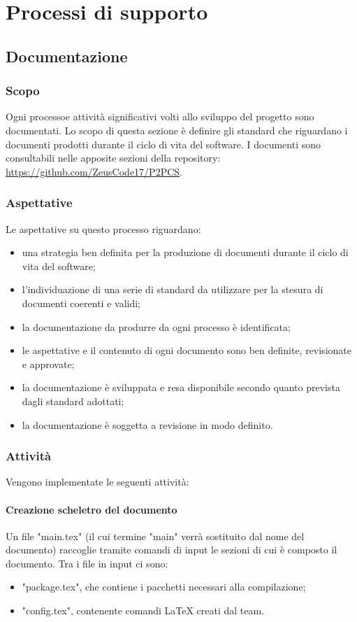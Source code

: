 \section{Processi di supporto}
\subsection{Documentazione}
	\subsubsection{Scopo}
	Ogni processo\glosp e attività significativi volti allo sviluppo del progetto sono documentati. Lo scopo di questa sezione è definire gli standard che riguardano i documenti prodotti durante il ciclo di vita del software.
	I documenti sono consultabili nelle apposite sezioni della repository\glo:\\ \url{https://github.com/ZeusCode17/P2PCS}. 		
	\subsubsection{Aspettative}
	Le aspettative su questo processo riguardano:
	\begin{itemize}
		\item una strategia ben definita per la produzione di documenti durante il ciclo di vita del software;
		\item l'individuazione di una serie di standard da utilizzare per la stesura di documenti coerenti e validi;
		\item la documentazione da produrre da ogni processo è identificata;
		\item le aspettative e il contenuto di ogni documento sono ben definite, revisionate e approvate;
		\item la documentazione è sviluppata e resa disponibile secondo quanto prevista dagli standard adottati;
		\item la documentazione è soggetta a revisione in modo definito.
	\end{itemize}
	
	\subsubsection{Attività}
	Vengono implementate le seguenti attività:
	
	\paragraph{Creazione scheletro del documento}
	Un file "main.tex" (il cui termine "main" verrà sostituito dal nome del documento) raccoglie tramite comandi di input le sezioni di cui è composto il documento. Tra i file in input ci sono:
	\begin{itemize}
		\item "package.tex", che contiene i pacchetti necessari alla compilazione;
		\item "config.tex", contenente comandi \LaTeX{} creati dal team.
	\end{itemize}
